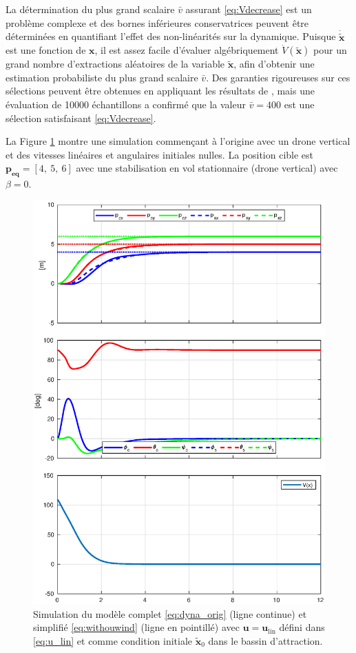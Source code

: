 La détermination du plus grand scalaire $\bar v$ assurant \eqref{eq:Vdecrease} est un problème complexe et des bornes inférieures conservatrices peuvent être déterminées en quantifiant l'effet des non-linéarités sur la dynamique. Puisque $\boldsymbol{\dot{\tilde x}}$ est une fonction de $\boldsymbol{x}$, il est assez facile d'évaluer algébriquement $\dot V(\boldsymbol{\tilde x})$ pour un grand nombre d'extractions aléatoires de la variable $\boldsymbol{\tilde x}$, afin d'obtenir une estimation probabiliste du plus grand scalaire $\bar v$. Des garanties rigoureuses sur ces sélections peuvent être obtenues en appliquant les résultats de \cite{tempo2013randomized}, mais une évaluation de 10000 échantillons a confirmé que la valeur $\bar v = 400$ est une sélection satisfaisant \eqref{eq:Vdecrease}.

La Figure \ref{fig_linearize_conv} montre une simulation commençant à l'origine avec un drone vertical et des vitesses linéaires et angulaires initiales nulles. La position cible est $\boldsymbol{p_{\text{eq}}} = [4,~5,~6]$ avec une stabilisation en vol stationnaire (drone vertical) avec $\beta = 0$.

\begin{figure}[ht!]
    \centering
    \includegraphics[trim=0cm 0.6cm 0cm 1cm,clip,width=0.8\columnwidth]{figures/converge2.eps}
    \caption{Simulation du modèle complet \eqref{eq:dyna_orig} (ligne continue) et simplifié \eqref{eq:withouwind} (ligne en pointillé) avec $\boldsymbol{u} = \boldsymbol{u}_{\text{lin}}$ défini dans 
    \eqref{eq:u_lin} et comme condition initiale $\tilde{ \boldsymbol{x}}_0$ dans le bassin d'attraction.}
    \label{fig_linearize_conv}
\end{figure}

